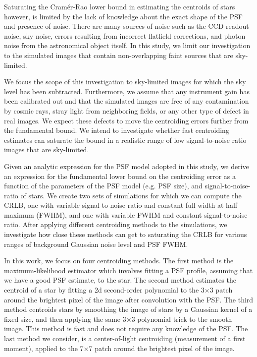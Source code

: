 \documentclass[onecolumn]{aastex61}
\newcommand{\todo}[1]{{\textcolor{dred}{ #1}}}
\begin{document}
\todo{Saturating the Cram\'{e}r-Rao lower bound in estimating the centroids of stars however, is limited
by the lack of knowledge about the exact shape of the PSF and presence of noise. There are many sources of noise such as the CCD readout noise, sky noise, errors resulting from 
incorrect flatfield corrections, and photon noise from the astronomical object itself. 
In this study, we limit our investigation to the simulated images that contain non-overlapping faint sources that are sky-limited.} 

\todo{We focus the scope of this investigation to sky-limited images for which the sky level has been subtracted. Furthermore, we assume that any instrument gain has been calibrated out and that the 
simulated images are free of any contamination by cosmic rays, stray light from neighboring fields, or 
any other type of defect in real images. We expect these defects to move the centroiding errors further from the fundamental bound. We intend to investigate whether fast centroiding estimates can saturate the bound in a realistic range of low signal-to-noise ratio images that are sky-limited.} 

Given an analytic expression for the PSF model adopted in this study,
we derive an expression for the fundamental lower bound on the centroiding error as
a function of the parameters of the PSF model (e.g. PSF size),
and signal-to-noise-ratio of stars. We create two sets of simulations for which we can 
compute the CRLB, one with variable signal-to-noise ratio and constant full width at half maximum (FWHM), and one 
with variable FWHM and constant signal-to-noise ratio. After applying
different centroiding methods to the simulations, we investigate how close 
these methods can get to saturating the CRLB for various ranges of background 
Gaussian noise level and PSF FWHM.

In this work, we focus on four centroiding methods. \todo{The first method is the maximum-likelihood 
estimator which involves fitting a PSF profile, assuming that we have a good PSF estimate, to the star.} 
The second method estimates the centroid of a star by fitting a 2d second-order polynomial to 
the 3$\times$3 patch around the brightest pixel of the image after convolution with the PSF. 
The third method centroids stars by
 smoothing the image of stars by a Gaussian kernel of a fixed size,
 and then applying the same 3$\times$3 polynomial trick to the smooth
 image. This method is fast and does not require any knowledge of the 
PSF. The last method we consider, is a center-of-light centroiding 
(measurement of a first moment), applied to the 7$\times$7 patch around the brightest pixel of the image.
\end{document}

